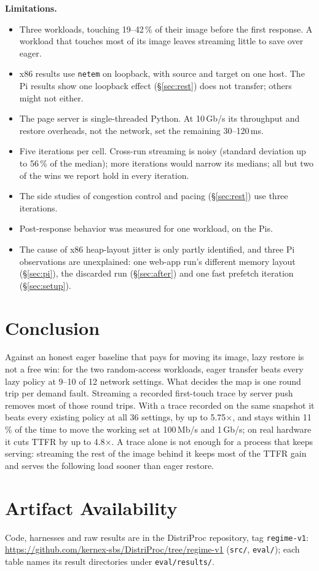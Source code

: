 \documentclass[conference]{IEEEtran}
\newcommand{\mode}[1]{\textsf{#1}}
\begin{document}
\textbf{Limitations.}
\begin{itemize}
\item Three workloads, touching 19--42\,\% of their image before the first
response. A workload that touches most of its image leaves streaming
little to save over eager.
\item x86 results use \texttt{netem} on loopback, with source and target on
one host. The Pi results show one loopback effect (\S\ref{sec:rest}) does
not transfer; others might not either.
\item The page server is single-threaded Python. At 10\,Gb/s its throughput
and restore overheads, not the network, set the remaining 30--120\,ms.
\item Five iterations per cell. Cross-run streaming is noisy (standard
deviation up to 56\,\% of the median); more iterations would narrow its
medians; all but two of the wins we report hold in every iteration.
\item The side studies of congestion control and pacing (\S\ref{sec:rest})
use three iterations.
\item Post-response behavior was measured for one workload, on the Pis.
\item The cause of x86 heap-layout jitter is only partly identified, and
three Pi observations are unexplained: one web-app run's different
memory layout (\S\ref{sec:pi}), the discarded run (\S\ref{sec:after})
and one fast \mode{prefetch} iteration (\S\ref{sec:setup}).
\end{itemize}

\section{Conclusion}

Against an honest eager baseline that pays for moving its image, lazy
restore is not a free win: for the two random-access workloads, eager
transfer beats every lazy policy at 9--10 of 12 network settings. What
decides the map is one round trip per demand fault. Streaming a recorded
first-touch trace by server push removes most of those round trips. With a
trace recorded on the same snapshot it beats every existing policy at all
36 settings, by up to 5.75$\times$, and stays within 11\,\% of the time to
move the working set at 100\,Mb/s and 1\,Gb/s; on real hardware it cuts
TTFR by up to 4.8$\times$. A trace alone is not enough for a process that
keeps serving: streaming the rest of the image behind it keeps most of the
TTFR gain and serves the following load sooner than eager restore.

\section*{Artifact Availability}
Code, harnesses and raw results are in the DistriProc repository,
tag \texttt{regime-v1}:
\url{https://github.com/kernex-sbs/DistriProc/tree/regime-v1}
(\texttt{src/}, \texttt{eval/}); each table names its result directories
under \texttt{eval/results/}.



\end{document}
